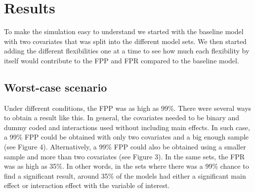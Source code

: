 \section{Results} 
To make the simulation easy to understand we started with the baseline model with two covariates that was split into the different model sets. We then started adding the different flexibilities one at a time to see how much each flexibility by itself would contribute to the FPP and FPR compared to the baseline model.

\subsection{Worst-case scenario}
Under different conditions, the FPP was as high as 99\%. There were several ways to obtain a result like this. In general, the covariates needed to be binary and dummy coded and interactions used without including main effects. In such case, a 99\% FPP could be obtained with only two covariates and a big enough sample (see Figure 4). Alternatively, a 99\% FPP could also be obtained using a smaller sample and more than two covariates (see Figure 3). In the same sets, the FPR was as high as 35\%. In other words, in the sets where there was a 99\% chance to find a significant result, around 35\% of the models had either a significant main effect or interaction effect with the variable of interest. 

